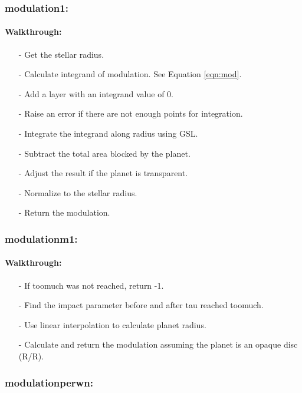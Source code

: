 \documentclass[letterpaper,12pt]{article}
\begin{document}
\subsubsection{modulation1:}
\paragraph{Walkthrough:}
\begin{enumerate}[leftmargin=10pt, noitemsep, parsep=0pt, topsep=0ex]
\item[-] Get the stellar radius.
\item[-] Calculate integrand of modulation. See Equation \ref{eqn:mod}.
\item[-] Add a layer with an integrand value of 0.
\item[-] Raise an error if there are not enough points for integration.
\item[-] Integrate the integrand along radius using GSL.
\item[-] Subtract the total area blocked by the planet.
\item[-] Adjust the result if the planet is transparent.
\item[-] Normalize to the stellar radius.
\item[-] Return the modulation.
\end{enumerate}

\subsubsection{modulationm1:}
\paragraph{Walkthrough:}
\begin{enumerate}[leftmargin=10pt, noitemsep, parsep=0pt, topsep=0ex]
\item[-] If toomuch was not reached, return -1.
\item[-] Find the impact parameter before and after tau reached toomuch.
\item[-] Use linear interpolation to calculate planet radius.
\item[-] Calculate and return the modulation assuming the planet is an opaque disc (R/R\sb{*}).
\end{enumerate}

\subsubsection{modulationperwn:}
\end{document}
